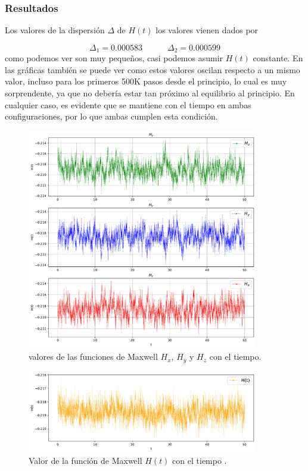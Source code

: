 \documentclass[11pt]{article} %
\newcommand{\tquad}{\quad \quad \quad}
\begin{document}
\subsubsection{Resultados}

Los valores de la dispersión $\Delta$ de $H(t)$ los valores vienen dados por

\begin{equation}
	\Delta_1 =  0.000583 \tquad \Delta_2 = 0.000599
\end{equation}
como podemos ver son muy pequeños, casi podemos asumir $H(t)$ constante. En las gráficas también se puede ver como estos valores oscilan respecto a un mismo valor, incluso para los primeros 500K pasos desde el principio, lo cual es muy sorprendente, ya que no debería estar tan próximo al equilibrio al principio. En cualquier caso, es evidente que se mantiene con el tiempo en ambas configuraciones, por lo que ambas cumplen esta condición. 

	
\begin{figure}[h!] \centering
	\includegraphics[width=0.9\textwidth]{../../Graficas/H_Boltzmann_xyz_1.pdf}
	\caption{valores de las funciones de Maxwell $H_x$, $H_y$ y $H_z$ con el tiempo.}
	\label{Fig:05}
\end{figure}

\begin{figure}[h!] \centering
	\includegraphics[width=0.9\textwidth]{../../Graficas/H_Boltzmann_1.pdf}
	\caption{Valor de la función de Maxwell $H(t)$ con el tiempo .}
	\label{Fig:06}
\end{figure}	
	
\end{document}
